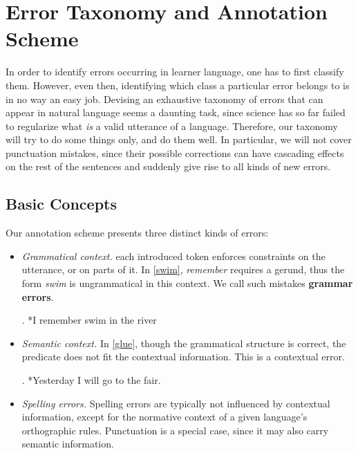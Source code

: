 \documentclass[12pt]{scrartcl}
\begin{document}
\section{Error Taxonomy and Annotation Scheme}\label{sec:scheme}

In order to identify errors occurring in learner language, one has to first
classify them. However, even then, identifying which class a particular error
belongs to is in no way an easy job. Devising an exhaustive taxonomy of errors
that can appear in natural language seems a daunting task, since science has so
far failed to regularize what \textit{is} a valid utterance of a language.
Therefore, our taxonomy will try to do some things only, and do them well. In
particular, we will not cover punctuation mistakes, since their possible
corrections can have cascading effects on the rest of the sentences and suddenly
give rise to all kinds of new errors.

\subsection{Basic Concepts}\label{sec:threeholies}

Our annotation scheme presents three distinct kinds of errors:

\begin{itemize}
  \item \textit{Grammatical context.} each introduced token enforces constraints
  on the utterance, or on parts of it. In \ref{swim}, \textit{remember} requires
  a gerund, thus the form \textit{swim} is ungrammatical in this context. We
  call such mistakes \textbf{grammar errors}.

  \ex. *I remember swim in the river\label{swim}

  \item \textit{Semantic context.}  In \ref{glue}, though the grammatical
  structure is correct, the predicate does not fit the contextual information.
  This is a contextual error.

  \ex. *Yesterday I will go to the fair.\label{glue}

  \item \textit{Spelling errors.} Spelling errors are typically not influenced
  by contextual information, except for the normative context of a given
  language's orthographic rules. Punctuation is a special case, since it may
  also carry semantic information.

  \end{itemize}
\end{document}

